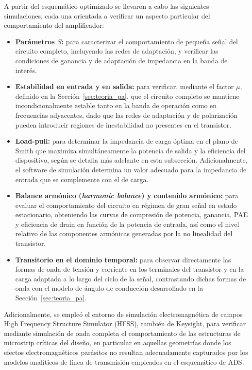 A partir del esquemático optimizado se llevaron a cabo las siguientes simulaciones, cada una orientada a verificar un aspecto particular del comportamiento del amplificador:

\begin{itemize}
    \item \textbf{Parámetros $S$:} para caracterizar el comportamiento de pequeña señal del circuito completo, incluyendo las redes de adaptación, y verificar las condiciones de ganancia y de adaptación de impedancia en la banda de interés.
    \item \textbf{Estabilidad en entrada y en salida:} para verificar, mediante el factor $\mu$, definido en la Sección~\ref{sec:teoria_pa}, que el circuito completo se mantiene incondicionalmente estable tanto en la banda de operación como en frecuencias adyacentes, dado que las redes de adaptación y de polarización pueden introducir regiones de inestabilidad no presentes en el transistor.
    \item \textbf{Load-pull:} para determinar la impedancia de carga óptima en el plano de Smith que maximiza simultáneamente la potencia de salida y la eficiencia del dispositivo, según se detalla más adelante en esta subsección. Adicionalmente, el software de simulación determina un valor adecuado para la impedancia de entrada que se complemente con el de carga.
    \item \textbf{Balance armónico (\textit{harmonic balance}) y contenido armónico:} para evaluar el comportamiento del circuito en régimen de gran señal en estado estacionario, obteniendo las curvas de compresión de potencia, ganancia, PAE y eficiencia de drain en función de la potencia de entrada, así como el nivel relativo de las componentes armónicas generadas por la no linealidad del transistor.
    \item \textbf{Transitorio en el dominio temporal:} para observar directamente las formas de onda de tensión y corriente en los terminales del transistor y en la carga adaptada a lo largo del ciclo de la señal, contrastando dichas formas de onda con el modelo de ángulo de conducción desarrollado en la Sección~\ref{sec:teoria_pa}.
\end{itemize}

Adicionalmente, se empleó el entorno de simulación electromagnética de campos High Frequency Structure Simulator (HFSS), también de Keysight, para verificar mediante simulación de onda completa el comportamiento de las estructuras de microstrip críticas del diseño, en particular en aquellas geometrías donde los efectos electromagnéticos parásitos no resultan adecuadamente capturados por los modelos analíticos de línea de transmisión empleados en el esquemático de ADS.

